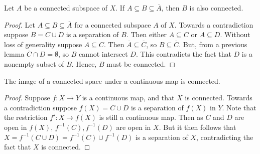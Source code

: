 \documentclass[12pt, a4paper, oneside, openright, titlepage]{book}
\begin{document}
\begin{thm}
    Let $A$ be a connected subspace of $X$. If $A \subseteq B \subseteq \overline{A}$, then $B$ is also connected.
\end{thm}
\begin{proof}
    Let $A \subseteq B \subseteq \overline{A}$ for a connected subspace $A$ of $X$. Towards a contradiction suppose $B = C\cup D$ is a separation of $B$. Then either $A \subseteq C$ or $A \subseteq D$. Without loss of generality suppose $A \subseteq C$. Then $\overline{A} \subseteq \overline{C}$, so $B \subseteq \overline{C}$. But, from a previous lemma $\overline{C}\cap D = \emptyset$, so $B$ cannot intersect $D$. This contradicts the fact that $D$ is a nonempty subset of $B$. Hence, $B$ must be connected.
\end{proof}


\begin{thm}
    The image of a connected space under a continuous map is connected.
\end{thm}
\begin{proof}
    Suppose $f:X\rightarrow Y$ is a continuous map, and that $X$ is connected. Towards a contradiction suppose $f(X) = C\cup D$ is a separation of $f(X)$ in $Y$. Note that the restriction $f':X\rightarrow f(X)$ is still a continuous map. Then as $C$ and $D$ are open in $f(X)$, $f^{-1}(C),f^{-1}(D)$ are open in $X$. But it then follows that $X = f^{-1}(C\cup D) = f^{-1}(C)\cup f^{-1}(D)$ is a separation of $X$, contradicting the fact that $X$ is connected.
\end{proof}
\end{document}
